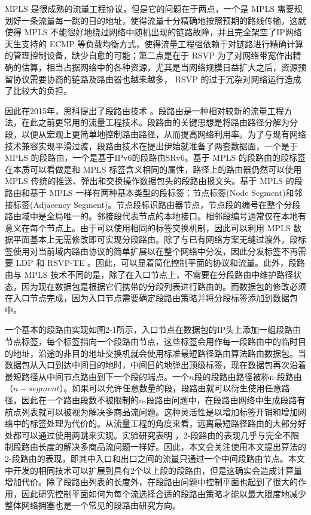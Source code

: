 \gls*{MPLS} 是很成熟的流量工程协议，但是它的问题在于两点，一个是 \gls*{MPLS} 需要规划好一条流量每一跳的目的地址，使得流量十分精确地按照预期的路线传输，这就使得 \gls*{MPLS} 不能很好地绕过网络中随机出现的链路故障，并且完全架空了IP网络天生支持的 \gls*{ECMP} 等负载均衡方式，使得流量工程强依赖于对链路进行精确计算的管理控制设备，缺少自愈的可能；第二点是在于 \gls*{RSVP} 为了对网络带宽作出精确的估算，相当占据网络中的各种资源，尤其是当网络规模日益扩大之后，资源预留协议需要协商的链路及路由器也越来越多， \gls*{RSVP} 的过于冗杂对网络运行造成了比较大的负担。

因此在2015年，思科提出了段路由技术 \cite{SRARK}。段路由是一种相对较新的流量工程方法，在此之前更常用的流量工程技术。段路由的关键思想是将路由路径分解为分段，以便从宏观上更简单地控制路由路径，从而提高网络利用率。为了与现有网络技术兼容实现平滑过渡，段路由技术在提出伊始就准备了两套数据面，一个是于 \gls*{MPLS} 的段路由，一个是基于IPv6的段路由SRv6。基于 \gls*{MPLS} 的段路由的段标签在本质可以看做是和 \gls*{MPLS} 标签含义相同的属性，路径上的路由器仍然可以使用 \gls*{MPLS} 传统的推送、弹出和交换操作数据包头的段路由报文头。基于 \gls*{MPLS} 的段路由和基于 \gls*{MPLS} 一样有两种基本类型的段标签：节点标签(Node Segment)和邻接标签(Adjacency Segment)。节点段标识路由器节点，节点段的编号在整个分段路由域中是全局唯一的。邻接段代表节点的本地接口。相邻段编号通常仅在本地有意义在每个节点上。由于可以使用相同的标签交换机制，因此可以利用 \gls*{MPLS} 数据平面基本上无需修改即可实现分段路由。除了与已有网络方案无缝过渡外，段标签使用对当前域内路由协议的简单扩展以在整个网络中分发，因此分发标签不再需要 \gls*{LDP} 和 \gls*{RSVP-TE} 。因此，可以显着简化控制平面的协议和流量。此外，段路由与 \gls*{MPLS} 技术不同的是，除了在入口节点上，不需要在分段路由中维护路径状态，因为现在数据包是根据它们携带的分段列表进行路由的。而数据包的修改必须在入口节点完成，因为入口节点需要确定段路由策略并将分段标签添加到数据包中。

一个基本的段路由实现如图2-1所示，入口节点在数据包的IP头上添加一组段路由节点标签，每个标签指向一个段路由节点，这些标签会用作每一段路由中的临时目的地址，沿途的非目的地址交换机就会使用标准最短路径路由算法路由数据包。当数据包从入口到达中间目的地时，中间目的地弹出顶级标签，现在数据包再次沿着最短路径从中间节点路由到下一个段的端点。一个$n$段的段路由路径被称n-段路由（$n-segment$）。如果可以允许任意数量的段，段路由就可以衍生使用任意路径，因此在一个路由段数不被限制的n-段路由问题中，在段路由网络中生成段路有航点列表就可以被视为解决多商品流问题。这种灵活性是以增加标签开销和增加网络中的标签处理为代价的。从流量工程的角度来看，远离最短路径路由的大部分好处都可以通过使用两跳来实现。实验研究表明 \cite{SIDLENGTHANALYSIS} \cite{SIDLENGTHPROVE} ，2-段路由的表现几乎与完全不限制段路由长度的解决多商品流问题一样好。因此，本文会关注使用本文提出算法的2-段路由的表现，即其中入口和出口之间的流量只通过一个中间段路由节点。本文中开发的相同技术可以扩展到具有2个以上段的段路由，但是这确实会造成计算量增加代价。除了段路由列表的长度外，在段路由问题中控制平面也起到了很大的作用，因此研究控制平面如何为每个流选择合适的段路由策略才能以最大限度地减少整体网络拥塞也是一个常见的段路由研究方向。

